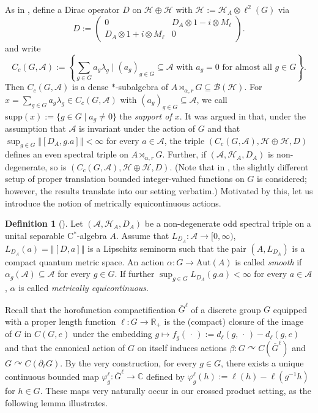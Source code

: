 \documentclass[a4paper,11pt,reqno]{amsart}
\numberwithin{equation}{section}
\numberwithin{equation}{section}
\theoremstyle{definition}
\newtheorem{definition}[theorem]{Definition}
\theoremstyle{remark}
\theoremstyle{remark}
\begin{document}
As in \cite[Section 2]{HSWZ13}, define a Dirac operator $D$ on $\mathcal{H}\oplus\mathcal{H}$
with $\mathcal{H}:=\mathcal{H}_{A}\otimes\ell^{2}(G)$ via 
\[
D:=\left(\begin{array}{cc}
0 & D_{A}\otimes1-i\otimes M_{\ell}\\
D_{A}\otimes1+i\otimes M_{\ell} & 0
\end{array}\right).
\]
and write 
\[
C_{c}(G,\mathcal{A}):=\left\{ \sum_{g\in G}a_{g}\lambda_{g}\mid(a_{g})_{g\in G}\subseteq\mathcal{A}\text{ with }a_{g}=0\text{ for almost all }g\in G\right\} .
\]
Then $C_{c}(G,\mathcal{A})$ is a dense $\ast$-subalgebra of $A\rtimes_{\alpha,r}G\subseteq\mathcal{B}(\mathcal{H})$.
For $x=\sum_{g\in G}a_{g}\lambda_{g}\in C_{c}(G,\mathcal{A})$ with
$(a_{g})_{g\in G}\subseteq\mathcal{A}$, we call $\text{supp}(x):=\{g\in G\mid a_{g}\neq0\}$
the \emph{support of $x$}. It was argued in \cite[Theorem 2.7]{HSWZ13}
that, under the assumption that $\mathcal{A}$ is invariant under
the action of $G$ and that $\sup_{g\in G}\left\Vert [D_{A},g.a]\right\Vert <\infty$
for every $a\in\mathcal{A}$, the triple $(C_{c}(G,\mathcal{A}),\mathcal{H}\oplus\mathcal{H},D)$
defines an even spectral triple on $A\rtimes_{\alpha,r}G$. Further,
if $(\mathcal{A},\mathcal{H}_{A},D_{A})$ is non-degenerate, so is
$(C_{c}(G,\mathcal{A}),\mathcal{H}\oplus\mathcal{H},D)$. (Note that
in \cite{HSWZ13}, the slightly different setup of proper translation
bounded integer-valued functions on $G$ is considered; however, the
results translate into our setting verbatim.)
Motivated by this, let us introduce the notion of metrically equicontinuous
actions.

\begin{definition}[{\cite[Definition 2.5]{HSWZ13}}] Let $(\mathcal{A},\mathcal{H}_{A},D_{A})$
be a non-degenerate odd spectral triple on a unital separable C$^{\ast}$-algebra $A$.
Assume that $L_{D_{A}}:\mathcal{A}\rightarrow[0,\infty)$, $L_{D_{A}}(a)=\left\Vert [D,a]\right\Vert $
is a Lipschitz seminorm such that the pair $(A,L_{D_{A}})$ is a compact
quantum metric space. An action $\alpha:G\rightarrow\text{Aut}(A)$
is called \emph{smooth} if $\alpha_{g}(\mathcal{A})\subseteq\mathcal{A}$
for every $g\in G$. If further $\sup_{g\in G}L_{D_{A}}(g.a)<\infty$
for every $a\in\mathcal{A}$, $\alpha$ is called \emph{metrically
equicontinuous}. \end{definition}

Recall that the horofunction compactification $\overline{G}^{\ell}$
of a discrete group $G$ equipped with a proper length function $\ell:G\rightarrow\mathbb{R}_{+}$
is the (compact) closure of the image of $G$ in $C(G,e)$ under the
embedding $g\mapsto f_{g}(\,\cdot\,):=d_{\ell}(g,\,\cdot\,)-d_{\ell}(g,e)$
and that the canonical action of $G$ on itself induces actions $\beta:G\curvearrowright C(\overline{G}^{\ell})$
and $G\curvearrowright C(\partial_{\ell}G)$. By the very construction,
for every $g\in G$, there exists a unique continuous bounded map $\varphi_{g}^{\ell}:\overline{G}^{\ell}\rightarrow\mathbb{C}$
defined by $\varphi_{g}^{\ell}(h):=\ell(h)-\ell(g^{-1}h)$ for $h\in G$.
These maps very naturally occur in our crossed product setting, as
the following lemma illustrates.
\end{document}
